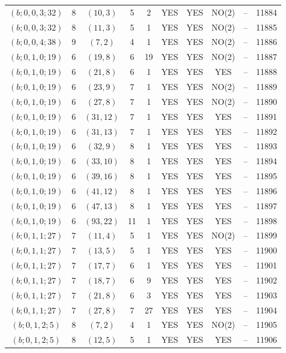 \begin{longtable}{|c|c|c|c|c|c|c|c|c|c|}
$(b; 0, 0, 3; 32)$ & 8 & $(10, 3)$ & 5 & 2 & YES & YES & NO(2) & -- & 11884\\
$(b; 0, 0, 3; 32)$ & 8 & $(11, 3)$ & 5 & 1 & YES & YES & NO(2) & -- & 11885\\
$(b; 0, 0, 4; 38)$ & 9 & $(7, 2)$ & 4 & 1 & YES & YES & NO(2) & -- & 11886\\
$(b; 0, 1, 0; 19)$ & 6 & $(19, 8)$ & 6 & 19 & YES & YES & NO(2) & -- & 11887\\
$(b; 0, 1, 0; 19)$ & 6 & $(21, 8)$ & 6 & 1 & YES & YES & YES & -- & 11888\\
$(b; 0, 1, 0; 19)$ & 6 & $(23, 9)$ & 7 & 1 & YES & YES & NO(2) & -- & 11889\\
$(b; 0, 1, 0; 19)$ & 6 & $(27, 8)$ & 7 & 1 & YES & YES & NO(2) & -- & 11890\\
$(b; 0, 1, 0; 19)$ & 6 & $(31, 12)$ & 7 & 1 & YES & YES & YES & -- & 11891\\
$(b; 0, 1, 0; 19)$ & 6 & $(31, 13)$ & 7 & 1 & YES & YES & YES & -- & 11892\\
$(b; 0, 1, 0; 19)$ & 6 & $(32, 9)$ & 8 & 1 & YES & YES & YES & -- & 11893\\
$(b; 0, 1, 0; 19)$ & 6 & $(33, 10)$ & 8 & 1 & YES & YES & YES & -- & 11894\\
$(b; 0, 1, 0; 19)$ & 6 & $(39, 16)$ & 8 & 1 & YES & YES & YES & -- & 11895\\
$(b; 0, 1, 0; 19)$ & 6 & $(41, 12)$ & 8 & 1 & YES & YES & YES & -- & 11896\\
$(b; 0, 1, 0; 19)$ & 6 & $(47, 13)$ & 8 & 1 & YES & YES & YES & -- & 11897\\
$(b; 0, 1, 0; 19)$ & 6 & $(93, 22)$ & 11 & 1 & YES & YES & YES & -- & 11898\\
$(b; 0, 1, 1; 27)$ & 7 & $(11, 4)$ & 5 & 1 & YES & YES & NO(2) & -- & 11899\\
$(b; 0, 1, 1; 27)$ & 7 & $(13, 5)$ & 5 & 1 & YES & YES & YES & -- & 11900\\
$(b; 0, 1, 1; 27)$ & 7 & $(17, 7)$ & 6 & 1 & YES & YES & YES & -- & 11901\\
$(b; 0, 1, 1; 27)$ & 7 & $(18, 7)$ & 6 & 9 & YES & YES & YES & -- & 11902\\
$(b; 0, 1, 1; 27)$ & 7 & $(21, 8)$ & 6 & 3 & YES & YES & YES & -- & 11903\\
$(b; 0, 1, 1; 27)$ & 7 & $(27, 8)$ & 7 & 27 & YES & YES & YES & -- & 11904\\
$(b; 0, 1, 2; 5)$ & 8 & $(7, 2)$ & 4 & 1 & YES & YES & NO(2) & -- & 11905\\
$(b; 0, 1, 2; 5)$ & 8 & $(12, 5)$ & 5 & 1 & YES & YES & YES & -- & 11906\\

\end{longtable}
